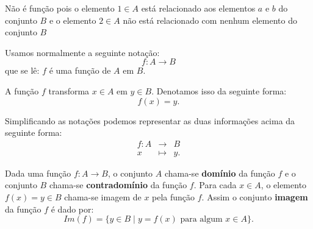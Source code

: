 \begin{multicols}{2}

Não é função pois o elemento $1 \in A$ está relacionado aos elementos $a$ e $b$ do conjunto $B$ e o elemento $2 \in A$ não está relacionado com nenhum elemento do conjunto $B$
\end{multicols}

Usamos normalmente a seguinte notação:
\begin{equation}
f: A \rightarrow B
\end{equation}
que se lê: $f$ é uma função de $A$ em $B$.

A função $f$ transforma $x \in A$ em $y \in B$. Denotamos isso da seguinte forma:
\begin{equation}
f(x) = y .
\end{equation}

Simplificando as notações podemos representar as duas informações acima da seguinte forma:
\begin{eqnarray*}
 f: A & \rightarrow & B \\
 x & \mapsto & y.
\end{eqnarray*}

Dada uma função $f: A \rightarrow B$, o conjunto $A$ chama-se \textbf{domínio} da função $f$ e o conjunto $B$ chama-se \textbf{contradomínio} da função $f$.  Para cada $x \in A$, o elemento $f(x)= y \in B$ chama-se imagem de $x$ pela função $f$. Assim o conjunto \textbf{imagem} da função $f$ é dado por:
\begin{equation}
Im(f)= \{ y \in B \mid y = f(x) \text{ para algum } x \in A\} .
\end{equation}

